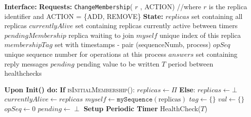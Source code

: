 \documentclass[10pt,a4paper,twocolumn]{article}
\begin{document}
\begin{algorithm}
	\caption{Membership Management - State, Init() \& Timer}
	\begin{algorithmic}
		\State \textbf{Interface:}
		\State \hspace{1em} \textbf{Requests:}
		\State \hspace{2em} \texttt{ChangeMembership}( $r$ , ACTION) //{where $r$ is the replica identifier and ACTION = \{ADD, REMOVE\}}
		\State
		\State \textbf{State:}
		\State \hspace{1em} $replicas$ {set containing all replicas}
		\State \hspace{1em} $currentlyAlive$ {set containing replicas currently active between timers}
		\State \hspace{1em} $pendingMembership$ {replica waiting to join }
		\State \hspace{1em} $myself$ {unique index of this replica}
		\State \hspace{1em} $membershipTag$ {set with timestamps - pair (sequenceNumb, process)}
		\State \hspace{1em} $opSeq$ {unique sequence number for operations at this process}
		\State \hspace{1em} $answers$ {set containing reply messages}
		\State \hspace{1em} $pending$ {pending value to be written}
		\State \hspace{1em} $T$ {period between healthchecks}
		\State

		\State \textbf{Upon Init() do:}
		\State \hspace{1em} \textbf{If} \textsc{isInitialMembership()}:
		\State \hspace{3em} $replicas \leftarrow \Pi$
		\State \hspace{1em} \textbf{Else}:
		\State \hspace{3em} $replicas \leftarrow \bot$
		\State \hspace{1em} $currentlyAlive \leftarrow replicas$
		\State \hspace{1em} $myself \leftarrow \texttt{mySequence}(\text{replicas})$
		\State \hspace{1em} $tag \leftarrow \{\}$
		\State \hspace{1em} $val \leftarrow \{\}$
		\State \hspace{1em} $opSeq \leftarrow 0$
		\State \hspace{1em} $pending \leftarrow \perp$
		\State \hspace{1em} \textbf{Setup Periodic Timer} HealthCheck($T$)
		\State


\end{algorithmic}
\end{algorithm}
\end{document}
